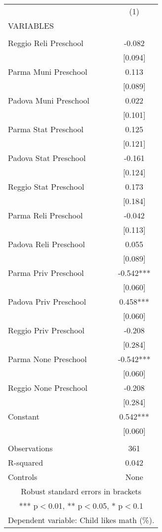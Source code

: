\begin{tabular}{lc} \hline
 & (1) \\
VARIABLES &  \\ \hline
 &  \\
Reggio Reli Preschool & -0.082 \\
 & [0.094] \\
Parma Muni Preschool & 0.113 \\
 & [0.089] \\
Padova Muni Preschool & 0.022 \\
 & [0.101] \\
Parma Stat Preschool & 0.125 \\
 & [0.121] \\
Padova Stat Preschool & -0.161 \\
 & [0.124] \\
Reggio Stat Preschool & 0.173 \\
 & [0.184] \\
Parma Reli Preschool & -0.042 \\
 & [0.113] \\
Padova Reli Preschool & 0.055 \\
 & [0.089] \\
Parma Priv Preschool & -0.542*** \\
 & [0.060] \\
Padova Priv Preschool & 0.458*** \\
 & [0.060] \\
Reggio Priv Preschool & -0.208 \\
 & [0.284] \\
Parma None Preschool & -0.542*** \\
 & [0.060] \\
Reggio None Preschool & -0.208 \\
 & [0.284] \\
Constant & 0.542*** \\
 & [0.060] \\
 &  \\
Observations & 361 \\
R-squared & 0.042 \\
 Controls & None \\ \hline
\multicolumn{2}{c}{ Robust standard errors in brackets} \\
\multicolumn{2}{c}{ *** p$<$0.01, ** p$<$0.05, * p$<$0.1} \\
\multicolumn{2}{c}{ Dependent variable: Child likes math (\%).} \\
\end{tabular}

